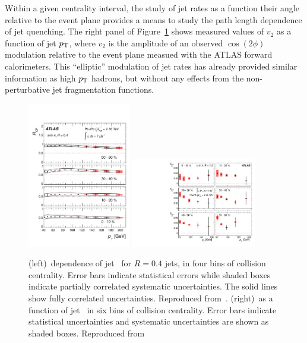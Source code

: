 Within a given centrality interval, the study of jet rates as a function their angle relative 
to the event plane provides a means to study the path length dependence of jet quenching.
The right panel of Figure~\ref{fig:pas:rcprfour} shows measured values of $v_2$ as a function
of jet $\mbox{$p_{\mathrm{T}}$}$, where $v_2$ is the amplitude of an observed $\cos(2\phi)$ modulation relative to
the event plane measued with the ATLAS forward calorimeters.  This ``elliptic'' modulation of
jet rates has already provided similar information as high $\mbox{$p_{\mathrm{T}}$}$ hadrons, but without 
any effects from the non-perturbative jet fragmentation functions.

\begin{figure}[!th]
\begin{center}
\includegraphics[width=0.4\textwidth]{jetfigures/ATLAS_jetRCP_04.pdf}
\includegraphics[width=0.49\textwidth]{jetfigures/ATLAS_jetv2.pdf}
\caption{
(left)\pT\ dependence of jet \Rcp\ for  $R=0.4$ jets,
in four bins of collision centrality. Error bars indicate
statistical errors while shaded boxes indicate
partially correlated systematic uncertainties. 
The solid lines show fully correlated uncertainties. 
Reproduced from~\cite{Aad:2012is}.
(right)\vtjet\ as a function of jet \pT\ in six bins of 
collision centrality.
Error bars indicate statistical uncertainties and 
systematic uncertainties are shown as shaded boxes. Reproduced from~\cite{Aad:2013sla}
}
\label{fig:pas:rcprfour}
\end{center}
\end{figure}

